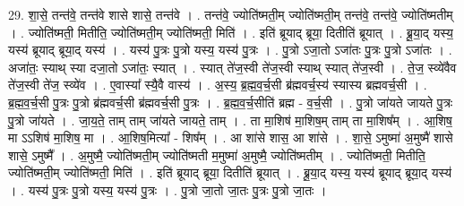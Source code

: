\documentclass[17pt]{extarticle}
\begin{document}
29. शा॒से॒ तन्त॑वे॒ तन्त॑वे शासे शासे॒ तन्त॑वे । . तन्त॑वे॒ ज्योति॑ष्मती॒म् ज्योति॑ष्मती॒म् तन्त॑वे॒ तन्त॑वे॒ ज्योति॑ष्मतीम् । . ज्योति॑ष्मती॒ मितीति॒ ज्योति॑ष्मती॒म् ज्योति॑ष्मती॒ मिति॑ । . इति॑ ब्रूयाद् ब्रूया॒ दितीति॑ ब्रूयात् । . ब्रू॒या॒द् यस्य॒ यस्य॑ ब्रूयाद् ब्रूया॒द् यस्य॑ । . यस्य॑ पु॒त्रः पु॒त्रो यस्य॒ यस्य॑ पु॒त्रः । . पु॒त्रो ऽजा॒तो ऽजा॑तः पु॒त्रः पु॒त्रो ऽजा॑तः । . अजा॑तः॒ स्याथ् स्या दजा॒तो ऽजा॑तः॒ स्यात् । . स्यात् ते॑ज॒स्वी ते॑ज॒स्वी स्याथ् स्यात् ते॑ज॒स्वी । . ते॒ज॒ स्व्ये॑वैव ते॑ज॒स्वी ते॑ज॒ स्व्ये॑व । . ए॒वास्या᳚ स्यै॒वै वास्य॑ । . अ॒स्य॒ ब्र॒ह्म॒व॒र्च॒सी ब्र॑ह्मवर्च॒स्य॑ स्यास्य ब्रह्मवर्च॒सी । . ब्र॒ह्म॒व॒र्च॒सी पु॒त्रः पु॒त्रो ब्र॑ह्मवर्च॒सी ब्र॑ह्मवर्च॒सी पु॒त्रः । . ब्र॒ह्म॒व॒र्च॒सीति॑ ब्रह्म - व॒र्च॒सी । . पु॒त्रो जा॑यते जायते पु॒त्रः पु॒त्रो जा॑यते । . जा॒य॒ते॒ ताम् ताम् जा॑यते जायते॒ ताम् । . ता मा॒शिष॑ मा॒शिष॒म् ताम् ता मा॒शिष᳚म् । . आ॒शिष॒ मा ऽऽशिष॑ मा॒शिष॒ मा । . आ॒शिष॒मित्या᳚ - शिष᳚म् । . आ शा॑से शास॒ आ शा॑से । . शा॒से॒ ऽमुष्मा॑ अ॒मुष्मै॑ शासे शासे॒ ऽमुष्मै᳚ । . अ॒मुष्मै॒ ज्योति॑ष्मती॒म् ज्योति॑ष्मती म॒मुष्मा॑ अ॒मुष्मै॒ ज्योति॑ष्मतीम् । . ज्योति॑ष्मती॒ मितीति॒ ज्योति॑ष्मती॒म् ज्योति॑ष्मती॒ मिति॑ । . इति॑ ब्रूयाद् ब्रूया॒ दितीति॑ ब्रूयात् । . ब्रू॒या॒द् यस्य॒ यस्य॑ ब्रूयाद् ब्रूया॒द् यस्य॑ । . यस्य॑ पु॒त्रः पु॒त्रो यस्य॒ यस्य॑ पु॒त्रः । . पु॒त्रो जा॒तो जा॒तः पु॒त्रः पु॒त्रो जा॒तः । \newline
\end{document}
